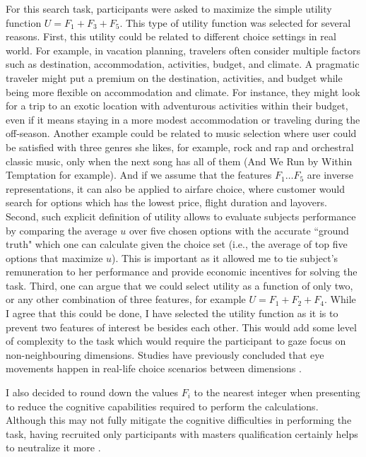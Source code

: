\documentclass[a4paper,12pt]{article}
\begin{document}
For this search task, participants were asked to maximize the simple utility function  $U = F_1 + F_3 + F_5$. This type of utility function was selected for several reasons. First, this utility could be related to different choice settings in real world. For example, in vacation planning, travelers often consider multiple factors such as destination, accommodation, activities, budget, and climate. A pragmatic traveler might put a premium on the destination, activities, and budget while being more flexible on accommodation and climate. For instance, they might look for a trip to an exotic location with adventurous activities within their budget, even if it means staying in a more modest accommodation or traveling during the off-season. Another example could be related to music selection where user could be satisfied with three genres she likes, for example, rock and rap and orchestral classic music, only when the next song has all of them (And We Run by Within Temptation for example). And if we assume that the features $F_1 \dots F_5$ are inverse representations, it can also be applied to airfare choice, where customer would search for options which has the lowest price, flight duration and layovers.  Second, such explicit definition of utility allows to evaluate subjects performance by comparing the average $u$ over five chosen options with the accurate ``ground truth" which one can calculate given the choice set (i.e., the average of top five options that maximize $u$). This is important as it allowed me to tie subject's remuneration to her performance and provide economic incentives for solving the task. Third, one can argue that we could select utility as a function of only two, or any other combination of three features, for example $U = F_1 + F_2 + F_4$. While I agree that this could be done, I have selected the utility function as it is to prevent two features of interest be besides each other. This would add some level of complexity to the task which would require the participant to gaze focus on non-neighbouring dimensions. Studies have previously concluded that eye movements happen in real-life choice scenarios between dimensions \citep{noguchi2018multialternative}.

I also decided to round down the values $F_i$ to the nearest integer when presenting to reduce the cognitive capabilities required to perform the calculations. Although this may not fully mitigate the cognitive difficulties in performing the task, having recruited only participants with masters qualification certainly helps to neutralize it more \citep{aguinis2020mturk}.
\end{document}
